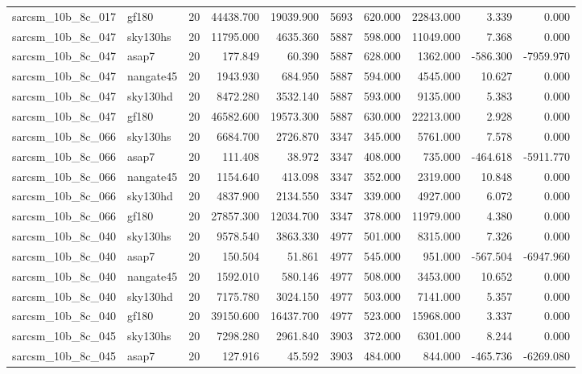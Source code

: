 \begin{tabular}{llrrrrrrrr}
sarcsm\_10b\_8c\_017 & gf180 & 20 & 44438.700 & 19039.900 & 5693 & 620.000 & 22843.000 & 3.339 & 0.000 \\
sarcsm\_10b\_8c\_047 & sky130hs & 20 & 11795.000 & 4635.360 & 5887 & 598.000 & 11049.000 & 7.368 & 0.000 \\
sarcsm\_10b\_8c\_047 & asap7 & 20 & 177.849 & 60.390 & 5887 & 628.000 & 1362.000 & -586.300 & -7959.970 \\
sarcsm\_10b\_8c\_047 & nangate45 & 20 & 1943.930 & 684.950 & 5887 & 594.000 & 4545.000 & 10.627 & 0.000 \\
sarcsm\_10b\_8c\_047 & sky130hd & 20 & 8472.280 & 3532.140 & 5887 & 593.000 & 9135.000 & 5.383 & 0.000 \\
sarcsm\_10b\_8c\_047 & gf180 & 20 & 46582.600 & 19573.300 & 5887 & 630.000 & 22213.000 & 2.928 & 0.000 \\
sarcsm\_10b\_8c\_066 & sky130hs & 20 & 6684.700 & 2726.870 & 3347 & 345.000 & 5761.000 & 7.578 & 0.000 \\
sarcsm\_10b\_8c\_066 & asap7 & 20 & 111.408 & 38.972 & 3347 & 408.000 & 735.000 & -464.618 & -5911.770 \\
sarcsm\_10b\_8c\_066 & nangate45 & 20 & 1154.640 & 413.098 & 3347 & 352.000 & 2319.000 & 10.848 & 0.000 \\
sarcsm\_10b\_8c\_066 & sky130hd & 20 & 4837.900 & 2134.550 & 3347 & 339.000 & 4927.000 & 6.072 & 0.000 \\
sarcsm\_10b\_8c\_066 & gf180 & 20 & 27857.300 & 12034.700 & 3347 & 378.000 & 11979.000 & 4.380 & 0.000 \\
sarcsm\_10b\_8c\_040 & sky130hs & 20 & 9578.540 & 3863.330 & 4977 & 501.000 & 8315.000 & 7.326 & 0.000 \\
sarcsm\_10b\_8c\_040 & asap7 & 20 & 150.504 & 51.861 & 4977 & 545.000 & 951.000 & -567.504 & -6947.960 \\
sarcsm\_10b\_8c\_040 & nangate45 & 20 & 1592.010 & 580.146 & 4977 & 508.000 & 3453.000 & 10.652 & 0.000 \\
sarcsm\_10b\_8c\_040 & sky130hd & 20 & 7175.780 & 3024.150 & 4977 & 503.000 & 7141.000 & 5.357 & 0.000 \\
sarcsm\_10b\_8c\_040 & gf180 & 20 & 39150.600 & 16437.700 & 4977 & 523.000 & 15968.000 & 3.337 & 0.000 \\
sarcsm\_10b\_8c\_045 & sky130hs & 20 & 7298.280 & 2961.840 & 3903 & 372.000 & 6301.000 & 8.244 & 0.000 \\
sarcsm\_10b\_8c\_045 & asap7 & 20 & 127.916 & 45.592 & 3903 & 484.000 & 844.000 & -465.736 & -6269.080 \\

\end{tabular}
